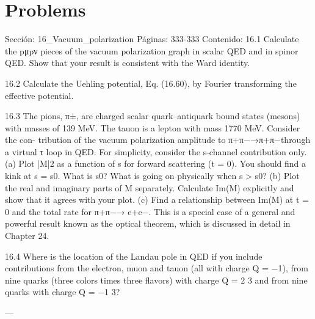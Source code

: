 \section*{Problems}
Sección: 16_Vacuum_polarization
Páginas: 333-333
Contenido:
16.1 Calculate the pμpν pieces of the vacuum polarization graph in scalar QED and in
spinor QED. Show that your result is consistent with the Ward identity.

16.2 Calculate the Uehling potential, Eq. (16.60), by Fourier transforming the effective
potential.

16.3 The pions, π±, are charged scalar quark–antiquark bound states (mesons) with
masses of 139 MeV. The tauon is a lepton with mass 1770 MeV. Consider the con-
tribution of the vacuum polarization amplitude to π+π−→π+π−through a virtual
τ loop in QED. For simplicity, consider the s-channel contribution only.
(a) Plot |M|2 as a function of s for forward scattering (t = 0). You should ﬁnd a
kink at s = s0. What is s0? What is going on physically when s > s0?
(b) Plot the real and imaginary parts of M separately. Calculate Im(M) explicitly
and show that it agrees with your plot.
(c) Find a relationship between Im(M) at t = 0 and the total rate for π+π−→
e+e−. This is a special case of a general and powerful result known as the optical
theorem, which is discussed in detail in Chapter 24.

16.4 Where is the location of the Landau pole in QED if you include contributions from
the electron, muon and tauon (all with charge Q = −1), from nine quarks (three
colors times three ﬂavors) with charge Q =
2
3 and from nine quarks with charge
Q = −1
3?


---

